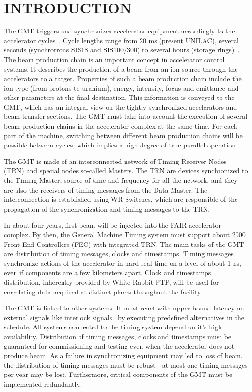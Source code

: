 \section{INTRODUCTION}

The GMT triggers and synchronizes accelerator equipment accordingly 
to the accelerator cycles~\cite{fair_rep}. Cycle lengths range 
from 20 ms (present UNILAC), several seconds (synchrotrons SIS18 
and SIS100/300) to several hours (storage rings)~\cite{gmt}. The beam production chain is an important concept in
accelerator control systems. It describes the production of a beam
from an ion source through the accelerators to a target. Properties of such a beam production 
chain include the ion type (from protons to uranium), energy, intensity, focus
and emittance and other parameters at the final destination. This information is
conveyed to the GMT, which 
has an integral view on the tightly synchronized accelerators and beam transfer
sections. The GMT must take into account the execution of several beam production 
chains in the accelerator complex at the same time. For each part of the machine, switching 
between different beam production chains will be possible between cycles, which implies a 
high degree of true parallel operation.

The GMT is made of an interconnected network of Timing Receiver Nodes (TRN) and
special nodes so-called Masters. The TRN are devices synchronized to the Timing
Master, source of time and frequency for all the network, and they are also the
receivers of timing messages from the Data Master. The interconnection is
established using WR Switches, which are responsible of the propagation of the
synchronization and timing messages to the TRN.

In  about  four years,  first  beam will  be  injected  into the  FAIR
accelerator complex. By then,  the General Machine Timing system
must support about 2000  Front End Controllers (FEC) with integrated TRN. 
The main tasks of the GMT are distribution 
of  timing messages, clocks  and timestamps.  Timing messages  synchronize actions of
the accelerator in hard real-time on a level of about 1 ns, even if
components are a few kilometers apart. Clock and timestamps
distribution, inherently  provided by White  Rabbit PTP, will  be used
for  correlating  data  acquired  at distinct  places  throughout  the
facility. 

The GMT  is linked to other  systems.  It must react  with upper bound
latency  on  external  signals  like interlock  signals~\cite{interlock}  by  executing
predefined alternatives in the  schedule. All systems connected to the
timing  system  depend on  it's  high  availability.  Distribution  of
timing messages, clocks and timestamps  must be guaranteed for commissioning and
testing even when the accelerator  does not produce beam. As a failure
in synchronizing equipment  may led to loss of  beam, the distribution
of timing messages must be robust -  at most one timing messages per year
may  be lost.  Furthermore, critical  components  of the  GMT must  be
implemented redundantly.

